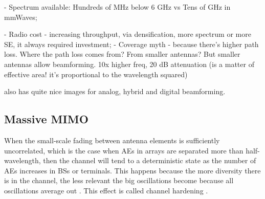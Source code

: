 - Spectrum available: Hundreds of MHz below 6 GHz vs Tens of GHz in mmWaves;

- Radio cost - increasing throughput, via densification, more spectrum or more SE, it always required investment;
- Coverage myth - because there's higher path loss. Where the path loss comes from? From smaller antennas? But smaller antennas allow beamforming. 10x higher freq, 20 dB attenuation (is a matter of effective area! it's proportional to the wavelength squared)

\cite{phdthesis} also has quite nice images for analog, hybrid and digital beamforming.



\subsection{Massive MIMO}







When the small-scale fading between antenna elements is sufficiently uncorrelated, which is the case when AEs in arrays are separated more than half-wavelength, then the channel will tend to a deterministic state as the number of AEs increases in BSs or terminals. This happens because the more diversity there is in the channel, the less relevant the big oscillations become because all oscillations average out . This effect is called channel hardening \cite{1327795}.


